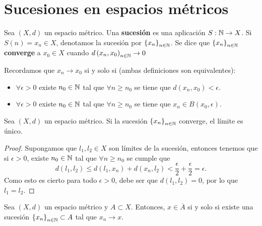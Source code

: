 \section{Sucesiones en espacios métricos}
\begin{definition}
	Sea $\displaystyle \left(X,d\right) $ un espacio métrico. Una \textbf{sucesión} es una aplicación $\displaystyle S : \mathbb{N} \to X $. Si $\displaystyle S\left(n\right) = x_{n} \in X $, denotamos la sucesión por $\displaystyle \left\{ x_{n}\right\} _{n\in\mathbb{N}} $. Se dice que $\displaystyle \left\{ x_{n}\right\} _{n\in\mathbb{N}} $ \textbf{converge} a $\displaystyle x_{0} \in X $ cuando $\displaystyle  d\left(x_{n}, x_{0}\right) _{n\in\mathbb{N}} \to 0 $ 
\end{definition}
\begin{observation}
	Recordamos que $\displaystyle x_{n} \to x_{0} $ si y solo si (ambas definiciones son equivalentes):
\begin{itemize}
\item  $\displaystyle \forall \epsilon > 0 $ existe $\displaystyle n_{0} \in \mathbb{N} $ tal que $\displaystyle \forall n \geq n_{0} $ se tiene que $\displaystyle d\left(x_{n}, x_{0}\right) < \epsilon  $.
\item $\displaystyle \forall \epsilon > 0 $ existe $\displaystyle n_{0} \in \mathbb{N} $ tal que $\displaystyle \forall n \geq n_{0} $ se tiene que $\displaystyle x_{n} \in B\left(x_{0}, \epsilon \right) $.
\end{itemize}
\end{observation}
\begin{prop}
	Sea $\displaystyle \left(X,d\right) $ un espacio métrico. Si la sucesión $\displaystyle \left\{ x_{n}\right\} _{n\in\mathbb{N}} $ converge, el límite es único.
\end{prop}
\begin{proof}
Supongamos que $\displaystyle l_{1}, l_{2} \in X $ son límites de la sucesión, entonces tenemos que si $\displaystyle \epsilon > 0 $, existe $\displaystyle n_{0} \in \mathbb{N} $ tal que $\displaystyle \forall n \geq n_{0} $ se cumple que
\[ d\left(l_{1}, l_{2}\right) \leq d\left(l_{1}, x_{n}\right) + d\left(x_{n}, l_{2}\right) < \frac{\epsilon }{2} + \frac{\epsilon }{2} = \epsilon .\]
Como esto es cierto para todo $\displaystyle \epsilon > 0 $, debe ser que $\displaystyle d\left(l_{1}, l_{2}\right) = 0 $, por lo que $\displaystyle l_{1} = l_{2} $.
\end{proof}
\begin{prop}
	Sea $\displaystyle \left(X,d\right) $ un espacio métrico y $\displaystyle A \subset X $. Entonces, $\displaystyle x \in \overline{A} $ si y solo si existe una sucesión $\displaystyle \left\{ x_{n}\right\} _{n\in\mathbb{N}} \subset A $ tal que $\displaystyle x_{n}\to x $.
\end{prop}
